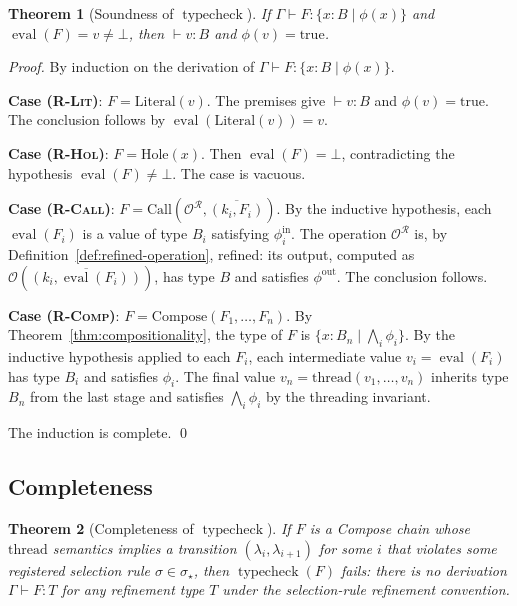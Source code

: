\documentclass[twocolumn,11pt,a4paper]{article}
\newtheorem{theorem}{Theorem}[section]
\DeclareMathOperator{\typecheck}{typecheck}
\DeclareMathOperator{\eval}{eval}
\newcommand{\Reg}{\mathcal{R}}
\newcommand{\Sel}{\sigma}
\newcommand{\Frag}{F}
\newcommand{\Ctx}{\Gamma}
\newcommand{\Op}{\mathcal{O}}
\newcommand{\rul}[1]{\textsc{(#1)}}
\newcommand{\vCall}[2]{\mathrm{Call}(#1,#2)}
\newcommand{\vComp}[1]{\mathrm{Compose}(#1)}
\newcommand{\vLit}[1]{\mathrm{Literal}(#1)}
\newcommand{\vHol}[1]{\mathrm{Hole}(#1)}
\begin{document}
\begin{theorem}[Soundness of $\typecheck$]
\label{thm:typecheck-sound}
If $\Ctx \vdash \Frag : \{x : B \mid \phi(x)\}$ and $\eval(\Frag) = v \neq \bot$, then $\vdash v : B$ and $\phi(v) = \mathrm{true}$.
\end{theorem}

\begin{proof}
By induction on the derivation of $\Ctx \vdash \Frag : \{x : B \mid \phi(x)\}$.

\textbf{Case \rul{R-Lit}}: $\Frag = \vLit{v}$. The premises give $\vdash v : B$ and $\phi(v) = \mathrm{true}$. The conclusion follows by $\eval(\vLit{v}) = v$.

\textbf{Case \rul{R-Hol}}: $\Frag = \vHol{x}$. Then $\eval(\Frag) = \bot$, contradicting the hypothesis $\eval(\Frag) \neq \bot$. The case is vacuous.

\textbf{Case \rul{R-Call}}: $\Frag = \vCall{\Op^\Reg}{\overline{(k_i, \Frag_i)}}$. By the inductive hypothesis, each $\eval(\Frag_i)$ is a value of type $B_i$ satisfying $\phi_i^{\mathrm{in}}$. The operation $\Op^\Reg$ is, by Definition~\ref{def:refined-operation}, refined: its output, computed as $\Op(\overline{(k_i, \eval(\Frag_i))})$, has type $B$ and satisfies $\phi^{\mathrm{out}}$. The conclusion follows.

\textbf{Case \rul{R-Comp}}: $\Frag = \vComp{\Frag_1, \ldots, \Frag_n}$. By Theorem~\ref{thm:compositionality}, the type of $\Frag$ is $\{x : B_n \mid \bigwedge_i \phi_i\}$. By the inductive hypothesis applied to each $\Frag_i$, each intermediate value $v_i = \eval(\Frag_i)$ has type $B_i$ and satisfies $\phi_i$. The final value $v_n = \mathrm{thread}(v_1, \ldots, v_n)$ inherits type $B_n$ from the last stage and satisfies $\bigwedge_i \phi_i$ by the threading invariant.

The induction is complete. \qed
\end{proof}

\subsection{Completeness}

\begin{theorem}[Completeness of $\typecheck$]
\label{thm:typecheck-complete}
If $\Frag$ is a Compose chain whose $\mathrm{thread}$ semantics implies a transition $(\lambda_i, \lambda_{i+1})$ for some $i$ that violates some registered selection rule $\Sel \in \Sel_\star$, then $\typecheck(\Frag)$ fails: there is no derivation $\Ctx \vdash \Frag : T$ for any refinement type $T$ under the selection-rule refinement convention.
\end{theorem}
\end{document}
